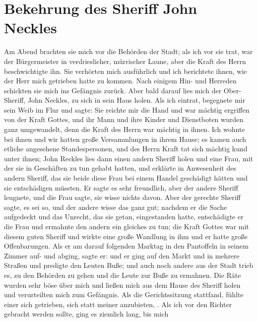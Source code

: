 \section{Bekehrung des Sheriff John Neckles}

Am Abend brachten
sie mich vor die Behörden der Stadt; als ich vor sie trat, war
der Bürgermeister in verdrieslicher, mürrischer Laune, aber die
Kraft des Herrn beschwichtigte ihn. Sie verhörten mich 
ausführlich und ich berichtete ihnen, wie der Herr mich 
getrieben hatte
zu kommen. Nach einigem Hin- und Herreden schickten sie mich
ins Gefängnis zurück. Aber bald darauf lies mich der Ober-Sheriff,
John Neckles, zu sich in 
sein Haus holen. Als ich eintrat, begegnete mir sein Weib 
im Flur und sagte:  Sie reichte mir die Hand und war mächtig
ergriffen von der Kraft Gottes, und ihr Mann und ihre Kinder
und Dienstboten wurden ganz umgewandelt, denn die Kraft des
Herrn war mächtig in ihnen. Ich wohnte bei ihnen und wir
hatten große Versammlungen in ihrem Hause; es kamen auch
etliche angesehene Standespersonen, und des Herrn Kraft tat sich
mächtig kund unter ihnen; John 
Reckles lies dann einen andern
Sheriff holen und eine Frau, mit der sie in Geschäften zu tun
gehabt hatten, und erklärte in Anwesenheit des andern Sheriff,
das sie beide diese Frau bei einem Handel geschädigt hätten und
sie entschädigen müssten. Er sagte es sehr freundlich, aber der
andere Sheriff leugnete, und die Frau sagte, sie wisse nichts 
davon. Aber der gerechte Sheriff sagte, es sei so, und der andere
wisse das ganz gut; nachdem er die Sache aufgedeckt und das
Unrecht, das sie getan, eingestanden hatte, entschädigte er die
Frau und ermahnte den andern ein gleiches zu tun; die Kraft
Gottes war mit diesem guten Sheriff und wirkte eine große
Wandlung in ihm und er hatte große Offenbarungen. Als er
am darauf folgenden Marktag in den Pantoffeln in seinem
Zimmer auf- und abging, sagte er:  und er ging auf den Markt
und in mehrere Straßen und predigte den Leuten Buße; und auch
noch andere aus der Stadt trieb es, zu den Behörden zu gehen
und die Leute zur Buße zu ermahnen. Die Räte wurden sehr
böse über mich und ließen mich aus dem Hause des Sheriff
holen und verurteilten mich zum Gefängnis. Als die 
Gerichtssitzung stattfand, fühlte einer sich 
getrieben, sich statt meiner anzubieten, . Als ich vor den
Richter gebracht werden sollte, ging es ziemlich lang, bis mich
